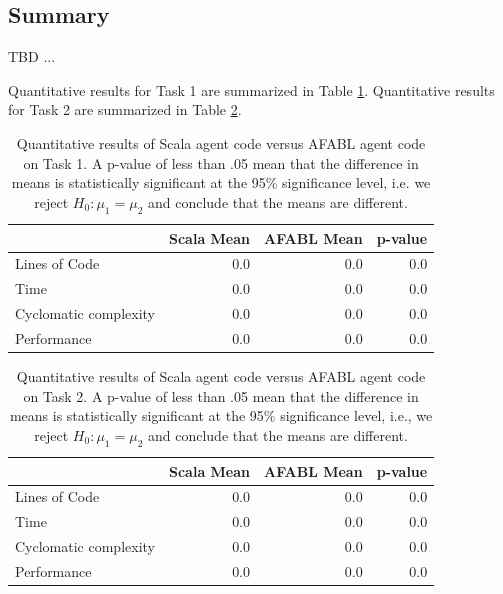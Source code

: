 \subsection{Summary}

TBD ...

Quantitative results for Task 1 are summarized in Table \ref{tbl:task1-results}. Quantitative results for Task 2 are summarized in Table \ref{tbl:task2-results}.

\begin{center}
\begin{table}[h]
\begin{tabular}{|l|r|r|r|}\hline
                      & Scala Mean & AFABL Mean & p-value \\\hline
Lines of Code         & 0.0        & 0.0        & 0.0 \\
Time                  & 0.0        & 0.0        & 0.0 \\
Cyclomatic complexity & 0.0        & 0.0        & 0.0 \\
Performance           & 0.0        & 0.0        & 0.0 \\\hline
\end{tabular}
\caption{Quantitative results of Scala agent code versus AFABL agent code on Task 1. A p-value of less than .05 mean that the difference in means is statistically significant at the 95\% significance level, i.e. we reject $H_0: \mu_1 = \mu_2$ and conclude that the means are different.}
\label{tbl:task1-results}
\end{table}
\end{center}

\begin{center}
\begin{table}[h]
\begin{tabular}{|l|r|r|r|}\hline
                      & Scala Mean & AFABL Mean & p-value \\\hline
Lines of Code         & 0.0        & 0.0        & 0.0 \\
Time                  & 0.0        & 0.0        & 0.0 \\
Cyclomatic complexity & 0.0        & 0.0        & 0.0 \\
Performance           & 0.0        & 0.0        & 0.0 \\\hline
\end{tabular}
\caption{Quantitative results of Scala agent code versus AFABL agent code on Task 2. A p-value of less than .05 mean that the difference in means is statistically significant at the 95\% significance level, i.e., we reject $H_0: \mu_1 = \mu_2$ and conclude that the means are different.}
\label{tbl:task2-results}
\end{table}
\end{center}

